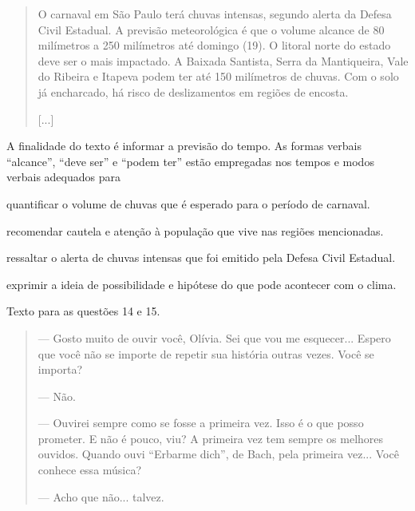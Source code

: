 \begin{quote}
O carnaval em São Paulo terá chuvas intensas, segundo alerta da Defesa
Civil Estadual. A previsão meteorológica é que o volume alcance de 80
milímetros a 250 milímetros até domingo (19). O litoral norte do estado
deve ser o mais impactado. A Baixada Santista, Serra da Mantiqueira,
Vale do Ribeira e Itapeva podem ter até 150 milímetros de chuvas. Com o
solo já encharcado, há risco de deslizamentos em regiões de encosta.

{[}...{]}

\end{quote}

A finalidade do texto é informar a previsão do tempo. As formas verbais
``alcance'', ``deve ser'' e ``podem ter'' estão empregadas nos tempos e
modos verbais adequados para

\begin{escolha}
\item quantificar o volume de chuvas que é esperado para o período de
carnaval.

\item recomendar cautela e atenção à população que vive nas regiões
mencionadas.

\item ressaltar o alerta de chuvas intensas que foi emitido pela Defesa
Civil Estadual.

\item exprimir a ideia de possibilidade e hipótese do que pode acontecer
com o clima.
\end{escolha}

Texto para as questões 14 e 15.

\begin{quote}
--- Gosto muito de ouvir você, Olívia. Sei que vou me esquecer... Espero
que você não se importe de repetir sua história outras vezes. Você se
importa?

--- Não.

--- Ouvirei sempre como se fosse a primeira vez. Isso é o que posso
prometer. E não é pouco, viu? A primeira vez tem sempre os melhores
ouvidos. Quando ouvi ``Erbarme dich'', de Bach, pela primeira vez...
Você conhece essa música?

--- Acho que não... talvez.

\end{quote}

